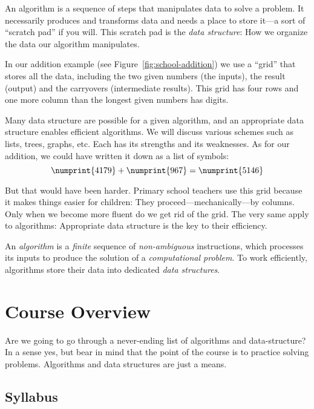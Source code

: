 \documentclass{aldast}
\begin{document}
An algorithm is a sequence of steps that manipulates data to solve a
problem. It necessarily produces and transforms data and needs a place
to store it---a sort of ``scratch pad'' if you will. This scratch pad
is the \emph{data structure}: How we organize the data our algorithm
manipulates.

In our addition example (see Figure~\ref{fig:school-addition}) we use
a ``grid'' that stores all the data, including the two
given numbers (the inputs), the result (output) and the carryovers
(intermediate results). This grid has four rows and one more column than
the longest given numbers has digits.

Many data structure are possible for a given algorithm, and an
appropriate data structure enables efficient algorithms. We will
discuss various schemes such as lists, trees, graphs, etc. Each has
its strengths and its weaknesses. As for our addition, we could have
written it down as a list of symbols:
\begin{equation}
\numprint{4179} + \numprint{967} = \numprint{5146}
\end{equation}

But that would have been harder. Primary school teachers use this grid
because it makes things easier for children: They
proceed---mechanically---by columns. Only when we become more fluent
do we get rid of the grid. The very same apply to algorithms:
Appropriate data structure is the key to their efficiency.

\begin{takeaway}
  An \emph{algorithm} is a \emph{finite} sequence of
  \emph{non-ambiguous} instructions, which processes its inputs to
  produce the solution of a \emph{computational problem}. To work
  efficiently, algorithms store their data into dedicated \emph{data
    structures}.
\end{takeaway}



\section{Course Overview}

Are we going to go through a never-ending list of algorithms and
data-structure? In a sense yes, but bear in mind that the point of the
course is to practice solving problems. Algorithms and data
structures are just a means.

\subsection{Syllabus}
\end{document}
